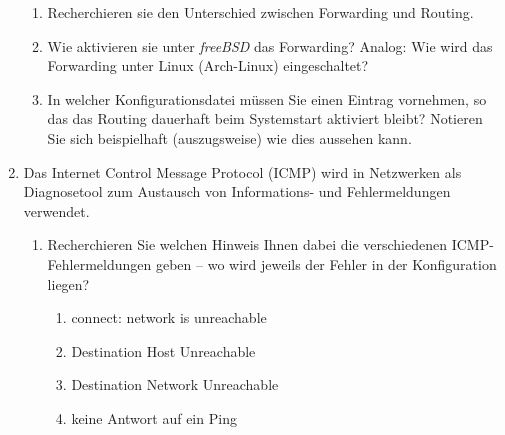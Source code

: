 \documentclass[paper=a4,fontsize=11pt]{scrartcl}%
\numberwithin{equation}{section}
\begin{document}
\begin{enumerate}
\begin{enumerate}
	\item Recherchieren sie den Unterschied zwischen Forwarding und Routing.
	\item Wie aktivieren sie unter \emph{freeBSD} das Forwarding? Analog: Wie wird  das Forwarding unter Linux (Arch-Linux) eingeschaltet?
	\item In welcher Konfigurationsdatei müssen Sie einen Eintrag vornehmen, so das das Routing dauerhaft beim Systemstart aktiviert bleibt? Notieren Sie sich beispielhaft (auszugsweise) wie dies aussehen kann.
	\end{enumerate}
	\item Das Internet Control Message Protocol (ICMP) wird in Netzwerken als Diagnosetool zum Austausch von Informations- und Fehlermeldungen verwendet. 
	\begin{enumerate}
		\item Recherchieren Sie welchen Hinweis Ihnen dabei die verschiedenen ICMP-Fehlermeldungen geben -- wo wird jeweils der Fehler in der Konfiguration liegen?
		\begin{enumerate}
			\item connect: network is unreachable
			\item Destination Host Unreachable
			\item Destination Network Unreachable
			\item keine Antwort auf ein Ping
		\end{enumerate}  
	\end{enumerate}
\end{enumerate}
\end{document}
